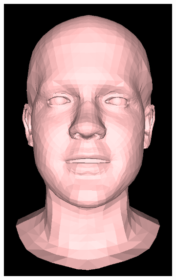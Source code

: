 \begin{figure}[h!]
\begin{subfigure}[b]{0.19\textwidth}
        \includegraphics[width=\textwidth]{figures/gen_sample/00035.png}
    \end{subfigure}
    \begin{subfigure}[b]{0.19\textwidth}

\end{subfigure}
\end{figure}
